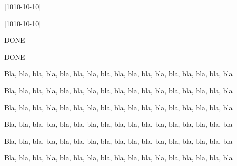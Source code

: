\documentclass[theme = bw]{../main/main}
\begin{document}
[1010-10-10]

\bigskip

[1010-10-10]

\bigskip
\bigskip
\bigskip

DONE

\bigskip

DONE

\bigskip

Bla, bla, bla, bla, bla, bla, bla, bla, bla, bla, bla, bla, bla, bla, bla, bla, bla

\begin{tdocfix}
	\item Bla, bla, bla, bla, bla, bla, bla, bla, bla, bla, bla, bla, bla, bla, bla, bla, bla
\end{tdocfix}

Bla, bla, bla, bla, bla, bla, bla, bla, bla, bla, bla, bla, bla, bla, bla, bla, bla

\begin{tdocnew}
	\item Bla, bla, bla, bla, bla, bla, bla, bla, bla, bla, bla, bla, bla, bla, bla, bla, bla
\end{tdocnew}

Bla, bla, bla, bla, bla, bla, bla, bla, bla, bla, bla, bla, bla, bla, bla, bla, bla

\begin{tdocbreak}
	\item Bla, bla, bla, bla, bla, bla, bla, bla, bla, bla, bla, bla, bla, bla, bla, bla, bla
\end{tdocbreak}
\end{document}
